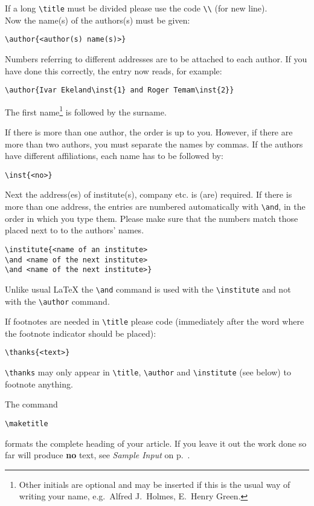 If a long \verb|\title| must be divided please use the
code  \verb|\\| (for new line).\\[6mm]
Now the name(s) of the authors(s) must be given:
\begin{verbatim}
\author{<author(s) name(s)>}
\end{verbatim}
Numbers referring to different addresses are
to be attached to each author.
If you have done this correctly, the entry now reads, for example:
\begin{verbatim}
\author{Ivar Ekeland\inst{1} and Roger Temam\inst{2}}
\end{verbatim}
The first name\footnote{Other initials are optional
and may be inserted if this is the usual
way of writing your name, e.g.\ Alfred J.~Holmes, E.~Henry Green.}
is followed by the surname.

If there is more than one author, the order is up to you.
However, if there are more than two authors, you must separate the names
by commas. If the authors have different affiliations,
each name has to be followed by:
\begin{verbatim}
\inst{<no>}
\end{verbatim}
\newpage
Next the address(es) of institute(s), company etc. is (are) required.
If there is more than one address, the entries are numbered
automatically with \verb|\and|, in the order in which you type them.
Please make sure that the numbers match those placed next to
to the authors' names.
\begin{verbatim}
\institute{<name of an institute>
\and <name of the next institute>
\and <name of the next institute>}
\end{verbatim}
Unlike usual \LaTeX{} the \verb|\and| command is used with the
\verb|\institute| and not with the \verb|\author| command.

\medskip
If footnotes are needed in \verb|\title| please code
(immediately after the word where the footnote
indicator should be placed):
\begin{verbatim}
\thanks{<text>}
\end{verbatim}
\verb|\thanks| may only appear in \verb|\title|, \verb|\author|
and \verb|\institute| (see below) to footnote anything.

\medskip\noindent
The command
\begin{verbatim}
\maketitle
\end{verbatim}
formats the complete heading of your article. If you leave
it out the work done so far will produce {\bf no} text,
see {\it Sample Input\/} on p.~\pageref{samppage}.

